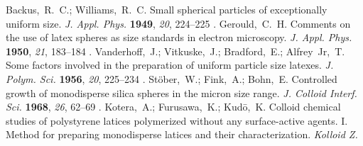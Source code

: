 \documentclass[journal=langd5,manuscript=article]{achemso}
\providecommand{\DIFaddbegin}{} %
\providecommand{\DIFaddend}{} %
\providecommand{\DIFdelend}{} %
\begin{document}
\DIFdelend \DIFaddbegin \begin{mcitethebibliography}{47}
\DIFaddend \providecommand*\natexlab[1]{#1}
\providecommand*\mciteSetBstSublistMode[1]{}
\providecommand*\mciteSetBstMaxWidthForm[2]{}
\providecommand*\mciteBstWouldAddEndPuncttrue
  {\def\EndOfBibitem{\unskip.}}
\providecommand*\mciteBstWouldAddEndPunctfalse
  {\let\EndOfBibitem\relax}
\providecommand*\mciteSetBstMidEndSepPunct[3]{}
\providecommand*\mciteSetBstSublistLabelBeginEnd[3]{}
\providecommand*\EndOfBibitem{}
\mciteSetBstSublistMode{f}
\mciteSetBstMaxWidthForm{subitem}{(\alph{mcitesubitemcount})}
\mciteSetBstSublistLabelBeginEnd
  {\mcitemaxwidthsubitemform\space}
  {\relax}
  {\relax}

Backus,~R.~C.; Williams,~R.~C. Small spherical particles of exceptionally
  uniform size. \emph{J. Appl. Phys.} \textbf{1949}, \emph{20}, 224--225\relax
\mciteBstWouldAddEndPuncttrue
\mciteSetBstMidEndSepPunct{\mcitedefaultmidpunct}
{\mcitedefaultendpunct}{\mcitedefaultseppunct}\relax
\EndOfBibitem
{}
Gerould,~C.~H. Comments on the use of latex spheres as size standards in
  electron microscopy. \emph{J. Appl. Phys.} \textbf{1950}, \emph{21},
  183--184\relax
\mciteBstWouldAddEndPuncttrue
\mciteSetBstMidEndSepPunct{\mcitedefaultmidpunct}
{\mcitedefaultendpunct}{\mcitedefaultseppunct}\relax
\EndOfBibitem
{}
Vanderhoff,~J.; Vitkuske,~J.; Bradford,~E.; Alfrey~Jr,~T. Some factors involved
  in the preparation of uniform particle size latexes. \emph{J. Polym. Sci.}
  \textbf{1956}, \emph{20}, 225--234\relax
\mciteBstWouldAddEndPuncttrue
\mciteSetBstMidEndSepPunct{\mcitedefaultmidpunct}
{\mcitedefaultendpunct}{\mcitedefaultseppunct}\relax
\EndOfBibitem
{}
St{\"o}ber,~W.; Fink,~A.; Bohn,~E. Controlled growth of monodisperse silica
  spheres in the micron size range. \emph{J. Colloid Interf. Sci.}
  \textbf{1968}, \emph{26}, 62--69\relax
\mciteBstWouldAddEndPuncttrue
\mciteSetBstMidEndSepPunct{\mcitedefaultmidpunct}
{\mcitedefaultendpunct}{\mcitedefaultseppunct}\relax
\EndOfBibitem
{}
Kotera,~A.; Furusawa,~K.; Kud{\=o},~K. Colloid chemical studies of polystyrene
  latices polymerized without any surface-active agents. {I.} Method for
  preparing monodisperse latices and their characterization. \emph{Kolloid Z.
}
\end{mcitethebibliography}
\end{document}
